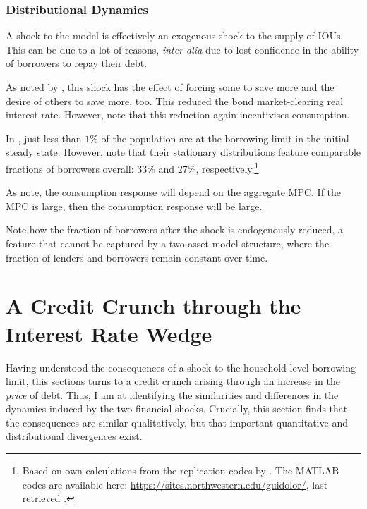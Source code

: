 \documentclass[12pt]{article} %
\numberwithin{equation}{section} %
\numberwithin{figure}{section}
\numberwithin{table}{section}
\begin{document}
\subsubsection*{Distributional Dynamics}

A shock to the model is effectively an exogenous shock to the supply of IOUs. This can be due to a lot of reasons, \textit{inter alia} due to lost confidence in the ability of borrowers to repay their debt.

As noted by \textcite{gl2017}, this shock has the effect of forcing some to save more and the desire of others to save more, too. This reduced the bond market-clearing real interest rate. However, note that this reduction again incentivises consumption.

In \textcite{gl2017}, just less than $1\%$ of the population are at the borrowing limit in the initial steady state. However, note that their stationary distributions feature comparable fractions of borrowers overall: $33\%$ and $27\%$, respectively.\footnote{Based on own calculations from the replication codes by \textcite{gl2017}. The MATLAB codes are available here: \url{https://sites.northwestern.edu/guidolor/}, last retrieved .}

As \textcite{gl2017} note, the consumption response will depend on the aggregate MPC. If the MPC is large, then the consumption response will be large.

Note how the fraction of borrowers after the shock is endogenously reduced, a feature that cannot be captured by a two-asset model structure, where the fraction of lenders and borrowers remain constant over time.

\section{A Credit Crunch through the Interest Rate Wedge}
\label{sec:wedge}

Having understood the consequences of a shock to the household-level borrowing limit, this sections turns to a credit crunch arising through an increase in the \textit{price} of debt. Thus, I am at identifying the similarities and differences in the dynamics induced by the two financial shocks. Crucially, this section finds that the consequences are similar qualitatively, but that important quantitative and distributional divergences exist. 
\end{document}
